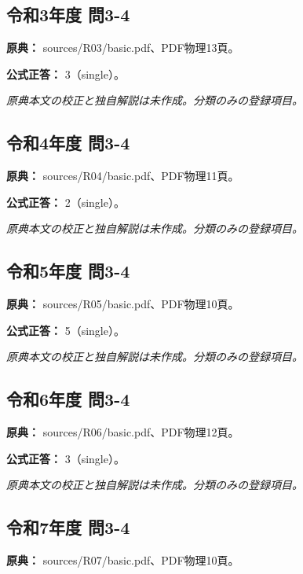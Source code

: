 \subsection{令和3年度 問3-4}
\label{q:r03-reg-basic-3-4}

\noindent\textbf{原典：} sources/R03/basic.pdf、PDF物理13頁。

\textbf{公式正答：} 3（single）。

\par\textit{原典本文の校正と独自解説は未作成。分類のみの登録項目。}

\subsection{令和4年度 問3-4}
\label{q:r04-reg-basic-3-4}

\noindent\textbf{原典：} sources/R04/basic.pdf、PDF物理11頁。

\textbf{公式正答：} 2（single）。

\par\textit{原典本文の校正と独自解説は未作成。分類のみの登録項目。}

\subsection{令和5年度 問3-4}
\label{q:r05-reg-basic-3-4}

\noindent\textbf{原典：} sources/R05/basic.pdf、PDF物理10頁。

\textbf{公式正答：} 5（single）。

\par\textit{原典本文の校正と独自解説は未作成。分類のみの登録項目。}

\subsection{令和6年度 問3-4}
\label{q:r06-reg-basic-3-4}

\noindent\textbf{原典：} sources/R06/basic.pdf、PDF物理12頁。

\textbf{公式正答：} 3（single）。

\par\textit{原典本文の校正と独自解説は未作成。分類のみの登録項目。}

\subsection{令和7年度 問3-4}
\label{q:r07-reg-basic-3-4}

\noindent\textbf{原典：} sources/R07/basic.pdf、PDF物理10頁。

